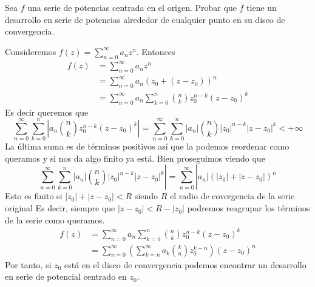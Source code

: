 \documentclass[twoside]{article}
\begin{document}
\newpage
\begin{ejercicio}{2}
Sea $f$ una serie de potencias centrada en el origen. Probar que $f$ tiene un desarrollo en serie de potencias alrededor de cualquier punto en su disco de convergencia.
\end{ejercicio}
\begin{solucion}
Consideremos $f(z)=\sum_{n=0}^\infty a_n z^n$. Entonces
\begin{align*}
f(z)&=\sum_{n=0}^\infty a_n z^n \\
&= \sum_{n=0}^\infty a_n (z_0 + (z-z_0))^n\\
&= \sum_{n=0}^\infty a_n \sum_{k=0}^n\binom{n}{k}z_0^{n-k}(z-z_0)^k
\end{align*}
Es decir queremos que
$$\sum_{n=0}^\infty \sum_{k=0}^n | a_n \binom{n}{k} z_0^{n-k} (z-z_0)^k | =
\sum_{n=0}^\infty \sum_{k=0}^n |a_n| \binom{n}{k} |z_0|^{n-k} |z-z_0|^k < +\infty$$
La última suma es de términos positivos así que la podemos reordenar como queramos y si nos da algo finito ya está.  Bien proseguimos viendo que
$$\sum_{n=0}^\infty \sum_{k=0}^n |a_n| \binom{n}{k} |z_0|^{n-k} |z-z_0|^k |=
\sum_{n=0}^\infty  |a_n| (|z_0|+|z-z_0|)^n$$
Esto es finito si $|z_0|+|z-z_0| < R$ siendo $R$ el radio de covergencia de la serie original
Es decir, siempre que $|z-z_0|<R-|z_0|$ podremos reagrupar los términos de la serie como queramos.
\begin{align*}
f(z)&=\sum_{n=0}^\infty a_n \sum_{k=0}^n\binom{n}{k}z_0^{n-k}(z-z_0)^k\\
&=\sum_{n=0}^\infty \left(\sum_{k=n}^\infty a_k \binom{k}{n}z_0^{k-n}\right) (z-z_0)^n
\end{align*}
Por tanto, si $z_0$ está en el disco de convergencia podemos encontrar un desarrollo en serie de potencial centrado en $z_0$.
\end{solucion}
\newpage
\end{document}
